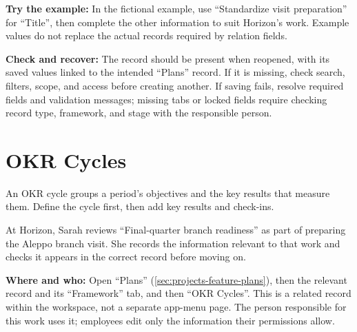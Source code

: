 \textbf{Try the example:} In the fictional example, use “Standardize visit preparation” for “Title”, then complete the other information to suit Horizon's work. Example values do not replace the actual records required by relation fields.

\textbf{Check and recover:} The record should be present when reopened, with its saved values linked to the intended “Plans” record. If it is missing, check search, filters, scope, and access before creating another. If saving fails, resolve required fields and validation messages; missing tabs or locked fields require checking record type, framework, and stage with the responsible person.

\clearpage
\section{OKR Cycles}
\label{sec:projects-feature-planning-okrs}

An OKR cycle groups a period's objectives and the key results that measure them. Define the cycle first, then add key results and check-ins.

\begin{rcnote}
At Horizon, Sarah reviews “Final-quarter branch readiness” as part of preparing the Aleppo branch visit. She records the information relevant to that work and checks it appears in the correct record before moving on.
\end{rcnote}

\textbf{Where and who:} Open “Plans” (\ref{sec:projects-feature-plans}), then the relevant record and its “Framework” tab, and then “OKR Cycles”. This is a related record within the workspace, not a separate app-menu page. The person responsible for this work uses it; employees edit only the information their permissions allow.

